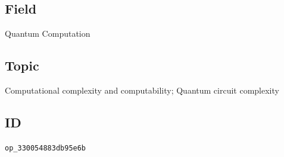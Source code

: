 \subsection*{Field}

Quantum Computation

\subsection*{Topic}

Computational complexity and computability; Quantum circuit complexity

\subsection*{ID}

\texttt{op\_330054883db95e6b}
